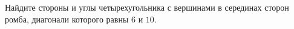 \begin{ex}
	\begin{condition}
		Найдите стороны и углы четырехугольника с вершинами в серединах сторон ромба, диагонали которого равны \( 6  \) и \( 10 \).
	\end{condition}
\end{ex}